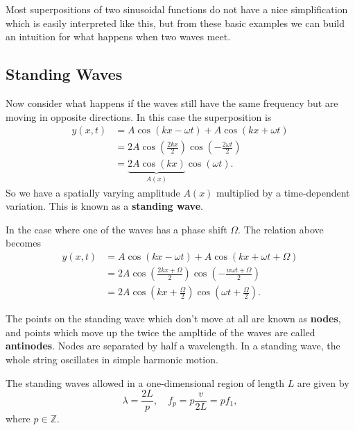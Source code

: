 \documentclass[../classical_mechanics.tex]{subfiles}
\begin{document}
        Most superpositions of two sinusoidal functions do not have a nice simplification which is easily interpreted like this, but from these basic examples we can build an intuition for what happens when two waves meet.

        \subsection{Standing Waves}\label{subsec:standing-waves}
            Now consider what happens if the waves still have the same frequency but are moving in opposite directions.
            In this case the superposition is
            \begin{align}
                y(x,t)&=A\cos(kx-\omega t)+A\cos(kx+\omega t)\\
                &=2A\cos\left(\frac{2kx}{2}\right)\cos\left(-\frac{2\omega t}{2}\right)\\
                &=\underbrace{2A\cos(kx)}_{A(x)}\cos(\omega t).
            \end{align}
            So we have a spatially varying amplitude $A(x)$ multiplied by a time-dependent variation.
            This is known as a \textbf{standing wave}.
            \begin{example}
                In the case where one of the waves has a phase shift $\Omega$. The relation above becomes
                \begin{align}
                    y(x,t)&=A\cos(kx-\omega t)+A\cos(kx+\omega t+\Omega)\\
                    &=2A\cos\left(\frac{2kx+\Omega}{2}\right)\cos\left(-\frac{w\omega t+\Omega}{2}\right)\\
                    &=2A\cos\left(kx+\frac{\Omega}{2}\right)\cos\left(\omega t+\frac{\Omega}{2}\right).
                \end{align}
            \end{example}

            The points on the standing wave which don't move at all are known as \textbf{nodes}, and points which move up the twice the ampltide of the waves are called \textbf{antinodes}.
            Nodes are separated by half a wavelength.
            In a standing wave, the whole string oscillates in simple harmonic motion.

            The standing waves allowed in a one-dimensional region of length $L$ are given by
            \begin{equation}
                \lambda=\frac{2L}{p},\quad f_p=p\frac{v}{2L}=pf_1,
            \end{equation}
            where $p\in\mathbb{Z}$.
\end{document}
